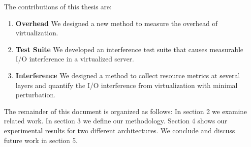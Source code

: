 \noindent
The contributions of this thesis are:
\begin{enumerate}
\item \textbf{Overhead} We designed a new method to measure the overhead of virtualization.
\item \textbf{Test Suite} We developed an interference test suite that causes measurable I/O interference in a virtualized server.
\item \textbf{Interference} We designed a method to collect resource metrics at several layers and quantify the I/O interference from virtualization with minimal perturbation.
\end{enumerate}

The remainder of this document is organized as follows:  In section 2 we examine related work.  In section 3 we define our methodology.  Section 4 shows our experimental results for two different architectures.   We conclude and discuss future work in section 5.

